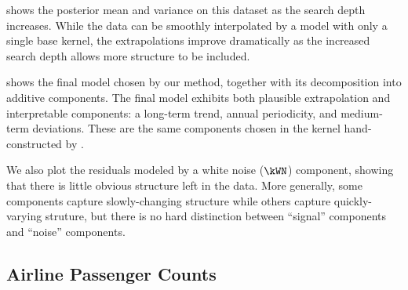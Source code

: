  shows the posterior mean and variance on this dataset as the search depth increases.
While the data can be smoothly interpolated by a model with only a single base kernel, the extrapolations improve dramatically as the increased search depth allows more structure to be included.

 shows the final model chosen by our method, together with its decomposition into additive components.
The final model exhibits both plausible extrapolation and interpretable components: a long-term trend, annual periodicity, and medium-term deviations.
These are the same components chosen in the kernel hand-constructed by \citet[Chapter 5]{rasmussen38gaussian}.

We also plot the residuals modeled by a white noise ($\kWN$) component, showing that there is little obvious structure left in the data.
More generally, some components capture slowly-changing structure while others capture quickly-varying struture, but there is no hard distinction between ``signal'' components and ``noise'' components.





\subsection{Airline Passenger Counts}

